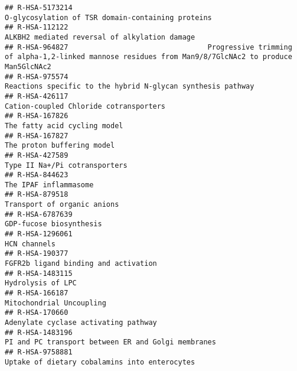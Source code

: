 \documentclass[
]{article}
\begin{document}
\begin{verbatim}
## R-HSA-5173214                                                                                    O-glycosylation of TSR domain-containing proteins
## R-HSA-112122                                                                                         ALKBH2 mediated reversal of alkylation damage
## R-HSA-964827                                 Progressive trimming of alpha-1,2-linked mannose residues from Man9/8/7GlcNAc2 to produce Man5GlcNAc2
## R-HSA-975574                                                                           Reactions specific to the hybrid N-glycan synthesis pathway
## R-HSA-426117                                                                                                Cation-coupled Chloride cotransporters
## R-HSA-167826                                                                                                          The fatty acid cycling model
## R-HSA-167827                                                                                                            The proton buffering model
## R-HSA-427589                                                                                                         Type II Na+/Pi cotransporters
## R-HSA-844623                                                                                                                 The IPAF inflammasome
## R-HSA-879518                                                                                                           Transport of organic anions
## R-HSA-6787639                                                                                                              GDP-fucose biosynthesis
## R-HSA-1296061                                                                                                                         HCN channels
## R-HSA-190377                                                                                                  FGFR2b ligand binding and activation
## R-HSA-1483115                                                                                                                    Hydrolysis of LPC
## R-HSA-166187                                                                                                              Mitochondrial Uncoupling
## R-HSA-170660                                                                                                  Adenylate cyclase activating pathway
## R-HSA-1483196                                                                                   PI and PC transport between ER and Golgi membranes
## R-HSA-9758881                                                                                        Uptake of dietary cobalamins into enterocytes

\end{verbatim}
\end{document}
